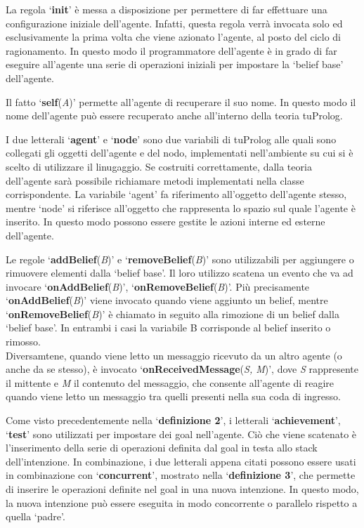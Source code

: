 La regola `\textbf{init}' \`e messa a disposizione per permettere di far effettuare una configurazione iniziale dell'agente. Infatti, questa regola verr\`a invocata solo ed esclusivamente la prima volta che viene azionato l'agente, al posto del ciclo di ragionamento. In questo modo il programmatore dell'agente \`e in grado di far eseguire all'agente una serie di operazioni iniziali per impostare la `belief base' dell'agente.

\medskip
Il fatto `\textbf{self}(\textit{A})' permette all'agente di recuperare il suo nome. In questo modo il nome dell'agente pu\`o essere recuperato anche all'interno della teoria tuProlog.

\medskip
I due letterali `\textbf{agent}' e `\textbf{node}' sono due variabili di tuProlog alle quali sono collegati gli oggetti dell'agente e del nodo, implementati nell'ambiente su cui si \`e scelto di utilizzare il linugaggio. Se costruiti correttamente, dalla teoria dell'agente sar\`a possibile richiamare metodi implementati nella classe corrispondente. La variabile `agent' fa riferimento all'oggetto dell'agente stesso, mentre `node' si riferisce all'oggetto che rappresenta lo spazio sul quale l'agente \`e inserito. In questo modo possono essere gestite le azioni interne ed esterne dell'agente.

\medskip
Le regole `\textbf{addBelief}(\textit{B})' e `\textbf{removeBelief}(\textit{B})' sono utilizzabili per aggiungere o rimuovere elementi dalla `belief base'. Il loro utilizzo scatena un evento che va ad invocare `\textbf{onAddBelief}(\textit{B})', `\textbf{onRemoveBelief}(\textit{B})'. Pi\`u precisamente `\textbf{onAddBelief}(\textit{B})' viene invocato quando viene aggiunto un belief, mentre `\textbf{onRemoveBelief}(\textit{B})' \`e chiamato in seguito alla rimozione di un belief dalla `belief base'. In entrambi i casi la variabile B corrisponde al belief inserito o rimosso.
\\
Diversamtene, quando viene letto un messaggio ricevuto da un altro agente (o anche da se stesso), \`e invocato `\textbf{onReceivedMessage}(\textit{S, M})', dove \textit{S} rappresente il mittente e \textit{M} il contenuto del messaggio, che consente all'agente di reagire quando viene letto un messaggio tra quelli presenti nella sua coda di ingresso.

\medskip
Come visto precedentemente nella `\textbf{definizione 2}', i letterali `\textbf{achievement}', `\textbf{test}' sono utilizzati per impostare dei goal nell'agente. Ci\`o che viene scatenato  \`e l'inserimento della serie di operazioni definita dal goal in testa allo stack dell'intenzione.
In combinazione, i due letterali appena citati possono essere usati in combinazione con `\textbf{concurrent}', mostrato nella `\textbf{definizione 3}', che permette di inserire le operazioni definite nel goal in una nuova intenzione. In questo modo, la nuova intenzione pu\`o essere eseguita in modo concorrente o parallelo rispetto a quella `padre'.


